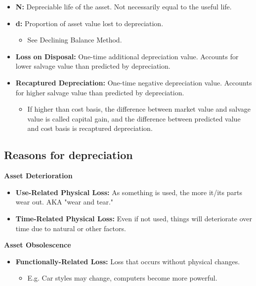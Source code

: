 \begin{terminology}
\begin{itemize}
        \item \textbf{N:} Depreciable life of the asset. Not necessarily equal to the useful life.
        
        \item \textbf{d:} Proportion of asset value lost to depreciation.
            \begin{itemize}
                \item See Declining Balance Method.
            \end{itemize}
        
        \item \textbf{Loss on Disposal:} One-time additional depreciation value. Accounts for lower salvage value than predicted by depreciation.
        
        \item \textbf{Recaptured Depreciation:} One-time negative depreciation value. Accounts for higher salvage value than predicted by depreciation.
            \begin{itemize}
                \item If higher than cost basis, the difference between market value and salvage value is called capital gain, and the difference between predicted value and cost basis is recaptured depreciation.
            \end{itemize}
    
    \end{itemize}
\end{terminology}

\subsection{Reasons for depreciation}
\begin{definition}

    \textbf{Asset Deterioration}
        \begin{itemize}
            \item \textbf{Use-Related Physical Loss:} As something is used, the more it/its parts wear out. AKA "wear and tear."
            \item \textbf{Time-Related Physical Loss:} Even if not used, things will deteriorate over time due to natural or other factors.
        \end{itemize}
        
    \textbf{Asset Obsolescence}
        \begin{itemize}
            \item \textbf{Functionally-Related Loss:} Loss that occurs without physical changes.
            \begin{itemize}
                \item E.g. Car styles may change, computers become more powerful.
            \end{itemize}
        \end{itemize}
\end{definition}

